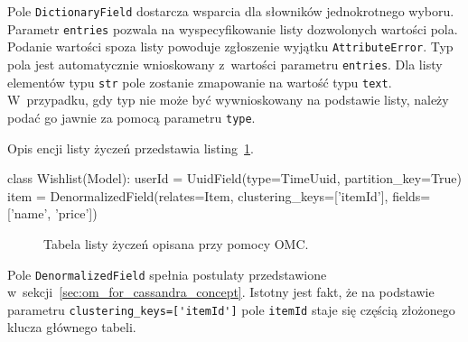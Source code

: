 Pole \verb+DictionaryField+ dostarcza wsparcia dla słowników jednokrotnego wyboru. Parametr \verb+entries+ pozwala na wyspecyfikowanie listy dozwolonych wartości pola. Podanie wartości spoza listy powoduje zgłoszenie wyjątku \verb+AttributeError+. Typ pola jest automatycznie wnioskowany z~wartości parametru \verb+entries+. Dla listy elementów typu \verb+str+ pole zostanie zmapowanie na wartość typu \verb+text+. W~przypadku, gdy typ nie może być wywnioskowany na podstawie listy, należy podać go jawnie za pomocą parametru \verb+type+.

Opis encji listy życzeń przedstawia listing~\ref{lst:omc_wishlist_definition}.

\begin{verbbox}[\footnotesize]
class Wishlist(Model):
    userId = UuidField(type=TimeUuid, partition_key=True)
    item = DenormalizedField(relates=Item, 
                             clustering_keys=['itemId'], 
                             fields=['name', 'price'])
\end{verbbox}

\begin{figure}[ht!]
	\centering
	\theverbbox
	\caption{Tabela listy życzeń opisana przy pomocy OMC.}
	\label{lst:omc_wishlist_definition}
\end{figure}

Pole \verb+DenormalizedField+ spełnia postulaty przedstawione w~sekcji~\ref{sec:om_for_cassandra_concept}. Istotny jest fakt, że na podstawie parametru \verb+clustering_keys=['itemId']+ pole \verb+itemId+ staje się częścią złożonego klucza głównego tabeli.
